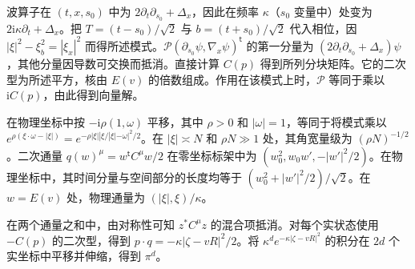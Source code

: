 波算子在 $(t,x,s_0)$ 中为 $2\partial_t\partial_{s_0}+\Delta_x$，因此在频率 $\kappa$（$s_0$ 变量中）处变为 $2\mathrm i\kappa\partial_t+\Delta_x$。把 $T=(t-s_0)/\sqrt2$ 与 $b=(t+s_0)/\sqrt2$ 代入相位，因 $|\xi|^2-\xi_b^2=|\xi_x|^2$ 而得所述模式。$\mathcal P(\partial_{s_0}\psi,\nabla_x\psi)^{\mathsf t}$ 的第一分量为 $(2\partial_t\partial_{s_0}+\Delta_x)\psi$，其他分量因导数可交换而抵消。直接计算 $C(p)$ 得到所列分块矩阵。它的二次型为所述平方，核由 $E(v)$ 的倍数组成。作用在该模式上时，$\mathcal P$ 等同于乘以 $\mathrm i C(p)$，由此得到向量解。

在物理坐标中按 $-\mathrm i\rho(1,\omega)$ 平移，其中 $\rho>0$ 和 $|\omega|=1$，等同于将模式乘以 $e^{\rho(\xi\cdot\omega-|\xi|)}=e^{-\rho|\xi||\xi/|\xi|-\omega|^2/2}$。在 $|\xi|\asymp N$ 和 $\rho N\gg1$ 处，其角宽量级为 $(\rho N)^{-1/2}$。二次通量 $q(w)^\mu=w^{\mathsf t}C^\mu w/2$ 在零坐标标架中为 $(w_0^2,w_0w',-|w'|^2/2)$。在物理坐标中，其时间分量与空间部分的长度均等于 $(w_0^2+|w'|^2/2)/\sqrt2$。在 $w=E(v)$ 处，物理通量为 $(|\xi|,\xi)/\kappa$。

在两个通量之和中，由对称性可知 $z^*C^\mu z$ 的混合项抵消。对每个实状态使用 $-C(p)$ 的二次型，得到 $p\cdot q=-\kappa|\zeta-vR|^2/2$。将 $\kappa^d e^{-\kappa|\zeta-vR|^2}$ 的积分在 $2d$ 个实坐标中平移并伸缩，得到 $\pi^d$。
